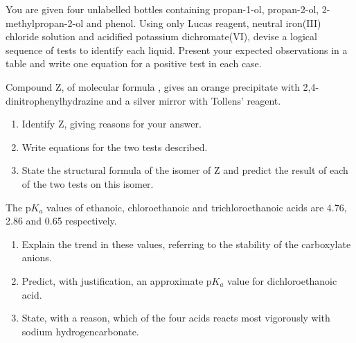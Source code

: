 \documentclass[11pt]{article}
\newcounter{popsec}
\newcounter{popsub}
\newcommand{\courssub}[1]{%
  \stepcounter{popsub}%
  \par\vspace{9pt}\noindent{\popxbold\fontsize{11.5}{13}\selectfont\color{popink}{\color{poporange}\thepopsec.\thepopsub}\hspace{6pt}#1}\par\nopagebreak\vspace{4pt}
}
\begin{document}
\begin{exercice}
You are given four unlabelled bottles containing propan-1-ol, propan-2-ol, 2-methylpropan-2-ol and phenol. Using only Lucas reagent, neutral iron(III) chloride solution and acidified potassium dichromate(VI), devise a logical sequence of tests to identify each liquid. Present your expected observations in a table and write one equation for a positive test in each case.
\end{exercice}

\begin{exercice}
Compound Z, of molecular formula , gives an orange precipitate with 2,4-dinitrophenylhydrazine and a silver mirror with Tollens' reagent.
\begin{enumerate}
\item Identify Z, giving reasons for your answer.
\item Write equations for the two tests described.
\item State the structural formula of the isomer of Z and predict the result of each of the two tests on this isomer.
\end{enumerate}
\end{exercice}

\begin{exercice}
The $\mathrm{p}K_a$ values of ethanoic, chloroethanoic and trichloroethanoic acids are 4.76, 2.86 and 0.65 respectively.
\begin{enumerate}
\item Explain the trend in these values, referring to the stability of the carboxylate anions.
\item Predict, with justification, an approximate $\mathrm{p}K_a$ value for dichloroethanoic acid.
\item State, with a reason, which of the four acids reacts most vigorously with sodium hydrogencarbonate.
\end{enumerate}
\end{exercice}

\courssub{I prepare for the GCE}
\end{document}
